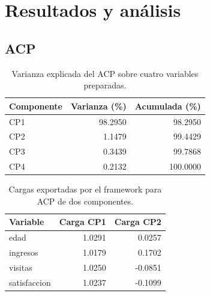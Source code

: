 \documentclass[11pt]{article}
\begin{document}
\section{Resultados y análisis}
\subsection{ACP}
\begin{table}[htbp]
\centering\small
\caption{Varianza explicada del ACP sobre cuatro variables preparadas.}\label{tab:acp}
\begin{tabular}{lrr}\toprule
Componente & Varianza (\%) & Acumulada (\%) \\ \midrule
CP1 & 98.2950 & 98.2950 \\
CP2 & 1.1479 & 99.4429 \\
CP3 & 0.3439 & 99.7868 \\
CP4 & 0.2132 & 100.0000 \\
\bottomrule\end{tabular}
\end{table}
\begin{table}[htbp]
\centering\small
\caption{Cargas exportadas por el framework para ACP de dos componentes.}\label{tab:cargas}
\begin{tabular}{lrr}\toprule
Variable & Carga CP1 & Carga CP2 \\ \midrule
edad & 1.0291 & 0.0257 \\
ingresos & 1.0179 & 0.1702 \\
visitas & 1.0250 & -0.0851 \\
satisfaccion & 1.0237 & -0.1099 \\
\bottomrule\end{tabular}
\end{table}
\end{document}
